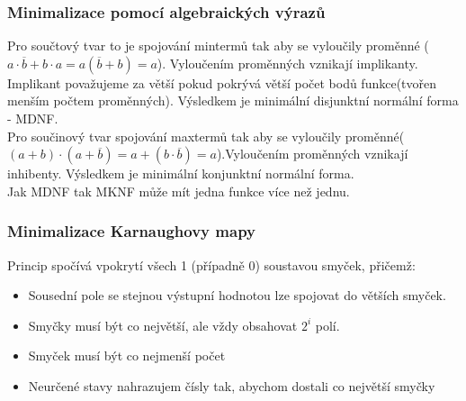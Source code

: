 \subsubsection*{Minimalizace pomocí algebraických výrazů}
Pro součtový tvar to je spojování mintermů tak aby se vyloučily proměnné (\(a \cdot \overline{b} + b \cdot a = a(\overline{b} + b) = a\)). Vyloučením proměnných vznikají implikanty. Implikant považujeme za větší pokud pokrývá větší počet bodů funkce(tvořen menším počtem proměnných). Výsledkem je minimální disjunktní normální forma - MDNF.\\
Pro součinový tvar spojování maxtermů tak aby se vyloučily proměnné(\((a+b)\cdot(a+\overline{b}) = a + (b \cdot \overline{b}) = a\)).Vyloučením proměnných vznikají inhibenty. Výsledkem je minimální konjunktní normální forma. \\
Jak MDNF tak MKNF může mít jedna funkce více než jednu.

\subsubsection*{Minimalizace Karnaughovy mapy}
Princip spočívá vpokrytí všech 1 (případně 0) soustavou smyček, přičemž:
\begin{itemize}
    \item Sousední pole se stejnou výstupní hodnotou lze spojovat do větších smyček.
    \item Smyčky musí být co největší, ale vždy obsahovat \(2^i\) polí.
    \item Smyček musí být co nejmenší počet
    \item Neurčené stavy nahrazujem čísly tak, abychom dostali co největší smyčky
\end{itemize}

